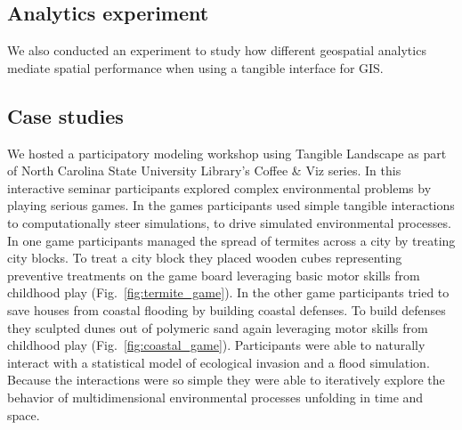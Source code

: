 \documentclass[prodmode,acmtochi]{acmsmall} %
\begin{document}
\subsection{Analytics experiment}
We also conducted an experiment to study how different geospatial analytics mediate spatial performance when using a tangible interface for GIS.





\subsection{Case studies}

We hosted a participatory modeling workshop using Tangible Landscape 
as part of North Carolina State University Library's Coffee \& Viz series. 
%
In this interactive seminar participants 
explored complex environmental problems 
by playing serious games. 
%
In the games
participants used simple tangible interactions 
to computationally steer simulations, 
to drive simulated environmental processes. 
%
In one game participants managed the spread of termites across a city by treating city blocks. 
To treat a city block they placed wooden cubes representing preventive treatments on the game board 
leveraging basic motor skills from childhood play 
(Fig.~\ref{fig:termite_game}).
%
In the other game participants tried to save houses from coastal flooding by building coastal defenses. 
To build defenses they sculpted dunes out of polymeric sand
again leveraging motor skills from childhood play
(Fig.~\ref{fig:coastal_game}). 
%
Participants were able to naturally 
interact with a statistical model of ecological invasion
and a flood simulation. 
Because the interactions were so simple %
they were able to iteratively 
explore the behavior of multidimensional environmental processes
unfolding in time and space. 


\end{document}

